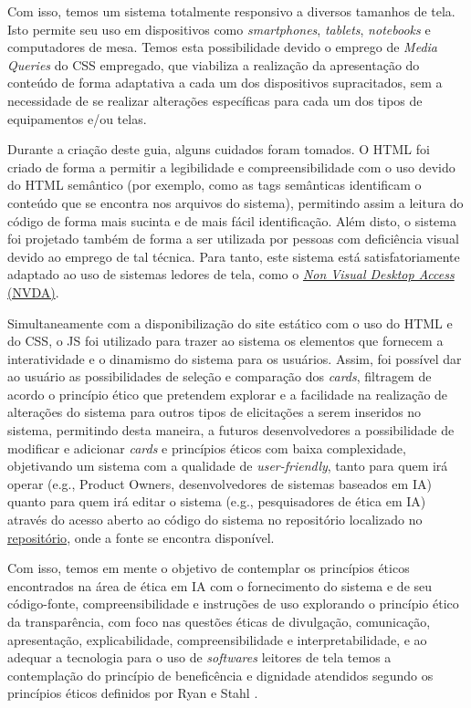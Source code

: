Com isso, temos um sistema totalmente responsivo a diversos tamanhos de tela. Isto permite seu uso em dispositivos como \textit{smartphones}, \textit{tablets}, \textit{notebooks} e computadores de mesa. Temos esta possibilidade devido o emprego de \textit{Media Queries} do \acrshort{CSS} empregado, que viabiliza a realização da apresentação do conteúdo de forma adaptativa a cada um dos dispositivos supracitados, sem a necessidade de se realizar alterações específicas para cada um dos tipos de equipamentos e/ou telas.

Durante a criação deste guia, alguns cuidados foram tomados. O \acrshort{HTML} foi criado de forma a permitir a legibilidade e compreensibilidade com o uso devido do \acrshort{HTML} semântico (por exemplo, como as tags semânticas identificam o conteúdo que se encontra nos arquivos do sistema), permitindo assim a leitura do código de forma mais sucinta e de mais fácil identificação. Além disto, o sistema foi projetado também de forma a ser utilizada por pessoas com deficiência visual devido ao emprego de tal técnica. Para tanto, este sistema está satisfatoriamente adaptado ao uso de sistemas ledores de tela, como o \href{https://www.nvaccess.org/}{\textit{Non Visual Desktop Access} (NVDA)}.

Simultaneamente com a disponibilização do site estático com o uso do \acrshort{HTML} e do \acrshort{CSS}, o \acrshort{JS} foi utilizado para trazer ao sistema os elementos que fornecem a interatividade e o dinamismo do sistema para os usuários. Assim, foi possível dar ao usuário as possibilidades de seleção e comparação dos \textit{cards}, filtragem de acordo o princípio ético que pretendem explorar e a facilidade na realização de alterações do sistema para outros tipos de elicitações a serem inseridos no sistema, permitindo desta maneira, a futuros desenvolvedores a possibilidade de modificar e adicionar \textit{cards} e princípios éticos com baixa complexidade, objetivando um sistema com a qualidade de \textit{user-friendly}, tanto para quem irá operar (e.g., Product Owners, desenvolvedores de sistemas baseados em IA) quanto para quem irá editar o sistema (e.g., pesquisadores de ética em IA) através do acesso aberto ao código do sistema no repositório localizado no  \href{https://www.GitHub.com/oggvaldo/eccola}{repositório}, onde a fonte se encontra disponível.

Com isso, temos em mente o objetivo de contemplar os princípios éticos encontrados na área de ética em IA com o fornecimento do sistema e de seu código-fonte, compreensibilidade e instruções de uso explorando o princípio ético da transparência, com foco nas questões éticas de divulgação, comunicação, apresentação, explicabilidade, compreensibilidade e interpretabilidade, e ao adequar a tecnologia para o uso de \textit{softwares} leitores de tela temos a contemplação do princípio de beneficência e dignidade atendidos segundo os princípios éticos definidos por Ryan e Stahl \cite{Ryan2020ArtificialIE}.

